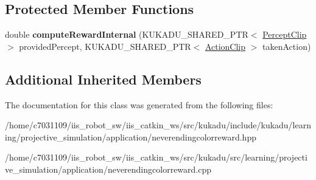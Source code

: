 \subsection*{Protected Member Functions}
\begin{DoxyCompactItemize}
\item 
\hypertarget{classkukadu_1_1NeverendingColorReward_aebb2ab5ecbdf9d6c3c8a5ac4931c8891}{double {\bfseries compute\-Reward\-Internal} (K\-U\-K\-A\-D\-U\-\_\-\-S\-H\-A\-R\-E\-D\-\_\-\-P\-T\-R$<$ \hyperlink{classkukadu_1_1PerceptClip}{Percept\-Clip} $>$ provided\-Percept, K\-U\-K\-A\-D\-U\-\_\-\-S\-H\-A\-R\-E\-D\-\_\-\-P\-T\-R$<$ \hyperlink{classkukadu_1_1ActionClip}{Action\-Clip} $>$ taken\-Action)}\label{classkukadu_1_1NeverendingColorReward_aebb2ab5ecbdf9d6c3c8a5ac4931c8891}

\end{DoxyCompactItemize}
\subsection*{Additional Inherited Members}


The documentation for this class was generated from the following files\-:\begin{DoxyCompactItemize}
\item 
/home/c7031109/iis\-\_\-robot\-\_\-sw/iis\-\_\-catkin\-\_\-ws/src/kukadu/include/kukadu/learning/projective\-\_\-simulation/application/neverendingcolorreward.\-hpp\item 
/home/c7031109/iis\-\_\-robot\-\_\-sw/iis\-\_\-catkin\-\_\-ws/src/kukadu/src/learning/projective\-\_\-simulation/application/neverendingcolorreward.\-cpp\end{DoxyCompactItemize}
